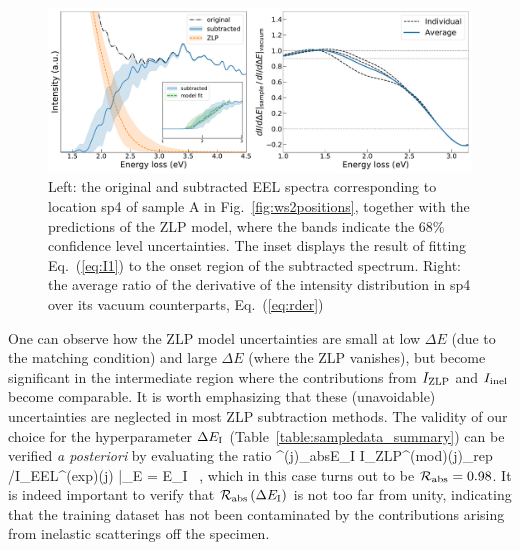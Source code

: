 \begin{figure}[t]
\begin{centering}
  \includegraphics[width=0.99\linewidth]{plots/SubtractedEELS_plot_sp14.pdf}
   \caption{Left: the original
     and subtracted EEL spectra corresponding to location sp4 of sample A in Fig.~\ref{fig:ws2positions},
     together with the predictions of the ZLP model, where
     the bands indicate the 68\% confidence level uncertainties.
     The inset displays the result of fitting Eq.~(\ref{eq:I1}) to the onset
     region of the subtracted spectrum.
     Right: the average ratio of the derivative of the intensity
     distribution in sp4 over its vacuum counterparts, Eq.~(\ref{eq:rder})
  }
\label{fig:sp14_subtracted_spectrum}
\end{centering}
\end{figure}

One can observe how the ZLP model uncertainties are small at low $\Delta E$
(due to the matching condition) and large $\Delta E$ (where the ZLP vanishes),
but become significant in the intermediate region where the contributions
from $I_{\rm ZLP}$ and $I_{\rm inel}$ become comparable.
%
It is worth emphasizing that these (unavoidable) uncertainties are neglected in most
ZLP subtraction methods.
%
The validity of our choice for the hyperparameter $\Delta E_{\rm I}$ (Table~\ref{table:sampledata_summary})
can be verified {\it a posteriori} by evaluating the ratio
\be
{}^{(j)}_{\rm abs}\lp \Delta E_{\rm I}\rp \equiv 
\la I_{\rm ZLP}^{({\rm mod})(j)}\ra_{\rm rep} \Big/I_{\rm EEL}^{({\rm exp})(j)} \Big|_{\Delta E = \Delta E_{\rm I}} \, ,
\ee
which in this case turns out to be $\mathcal{R}_{\rm abs} = 0.98$.
%
It is indeed important to verify that $\mathcal{R}_{\rm abs}\left( \Delta E_{\rm I}\right)$ is not too far from unity,
indicating that the training dataset has not been contaminated by the  contributions
arising from inelastic scatterings off the specimen.

